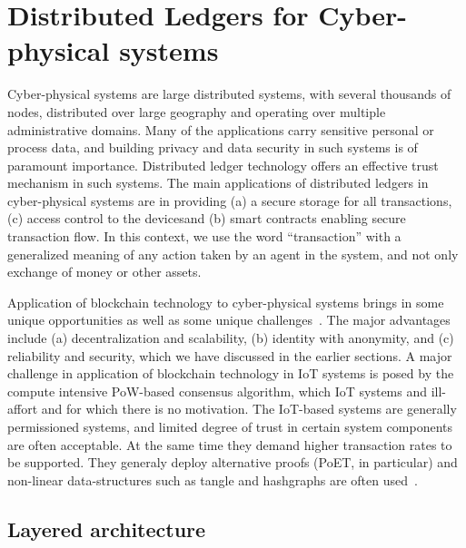 \section{Distributed Ledgers for Cyber-physical systems}

Cyber-physical systems are large distributed systems, with several thousands of nodes, distributed over large geography and
operating over multiple administrative domains. Many of the applications carry sensitive personal or process data, and building 
privacy and data security in such systems is of paramount importance. Distributed ledger technology offers an effective trust 
mechanism in such systems. The main applications of distributed ledgers in cyber-physical systems are in providing (a) a secure 
storage for all transactions, (c) access control to the devicesand (b) smart contracts enabling secure transaction flow. In this 
context, we use the word ``transaction'' with a generalized meaning of any action taken by an agent in the system, and not only 
exchange of money or other assets. 
%
 
Application of blockchain technology to cyber-physical systems brings in some unique opportunities as well as some unique 
challenges~\citep{Reyna:2018}. The major advantages include (a) decentralization and scalability, (b) identity with anonymity, and 
(c) reliability and security, which we have discussed in the earlier sections. 
%
   
A major challenge in application of blockchain technology in IoT systems is posed by the compute intensive PoW-based consensus algorithm,
which IoT systems and ill-affort and for which there is no motivation. The IoT-based systems are generally permissioned systems, and 
limited degree of trust in certain system components are often acceptable. At the same time they demand higher transaction rates to
be supported. They generaly deploy alternative proofs (PoET, in particular) and non-linear data-structures such as tangle and hashgraphs 
are often used~\citep{Khor:2021}. 

\subsection{Layered architecture}


